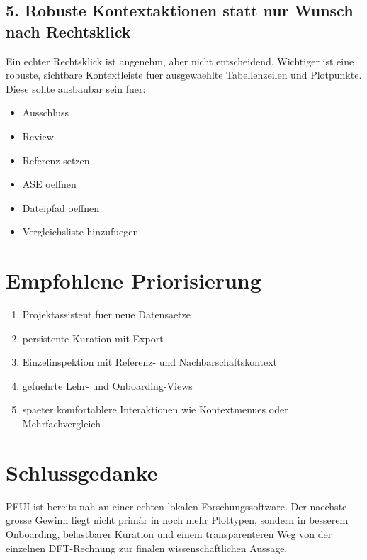\documentclass[11pt,a4paper]{article}
\begin{document}
\subsection*{5. Robuste Kontextaktionen statt nur Wunsch nach Rechtsklick}
Ein echter Rechtsklick ist angenehm, aber nicht entscheidend. Wichtiger ist eine robuste, sichtbare Kontextleiste fuer ausgewaehlte Tabellenzeilen und Plotpunkte. Diese sollte ausbaubar sein fuer:
\begin{itemize}
  \item Ausschluss
  \item Review
  \item Referenz setzen
  \item ASE oeffnen
  \item Dateipfad oeffnen
  \item Vergleichsliste hinzufuegen
\end{itemize}

\section*{Empfohlene Priorisierung}
\begin{enumerate}
  \item Projektassistent fuer neue Datensaetze
  \item persistente Kuration mit Export
  \item Einzelinspektion mit Referenz- und Nachbarschaftskontext
  \item gefuehrte Lehr- und Onboarding-Views
  \item spaeter komfortablere Interaktionen wie Kontextmenues oder Mehrfachvergleich
\end{enumerate}

\section*{Schlussgedanke}
PFUI ist bereits nah an einer echten lokalen Forschungssoftware. Der naechste grosse Gewinn liegt nicht prim\"ar in noch mehr Plottypen, sondern in besserem Onboarding, belastbarer Kuration und einem transparenteren Weg von der einzelnen DFT-Rechnung zur finalen wissenschaftlichen Aussage.
\end{document}
